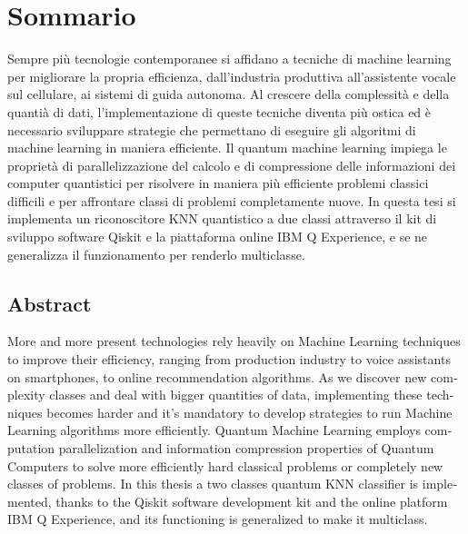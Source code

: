 \begingroup
\let\clearpage\relax
\let\cleardoublepage\relax
\let\cleardoublepage\relax

\chapter*{Sommario}
Sempre più tecnologie contemporanee si affidano a tecniche di machine 
learning per migliorare la propria efficienza, dall'industria produttiva 
all'assistente vocale sul cellulare, ai sistemi di guida autonoma. 
Al crescere della complessità e della quantià di dati, 
l'implementazione di queste tecniche diventa più 
ostica ed è necessario sviluppare strategie che permettano di eseguire 
gli algoritmi di machine learning in maniera efficiente. 
Il quantum machine learning impiega le proprietà di parallelizzazione del 
calcolo e di compressione delle informazioni dei computer quantistici per 
risolvere in maniera più efficiente problemi classici difficili e per 
affrontare classi di problemi completamente nuove. 
In questa tesi si implementa un riconoscitore KNN quantistico a due classi 
attraverso il kit di sviluppo software Qiskit e la piattaforma online 
IBM Q Experience, 
e se ne generalizza il funzionamento per renderlo multiclasse. 



\vfill

\begin{otherlanguage}{english}
\chapter*{Abstract}
More and more present technologies rely heavily on Machine Learning techniques 
to improve their efficiency, ranging from production industry to voice 
assistants on smartphones, to online recommendation algorithms. 
As we discover new complexity classes and deal with bigger quantities of data, 
implementing these techniques becomes harder and it's mandatory to develop 
strategies to run Machine Learning algorithms more efficiently. 
Quantum Machine Learning employs computation parallelization and information 
compression properties of Quantum Computers to solve more efficiently hard 
classical problems or completely new classes of problems. 
In this thesis a two classes quantum KNN classifier is implemented, thanks 
to the Qiskit software development kit and the online platform IBM Q 
Experience, and its functioning is generalized to make it multiclass. 
\end{otherlanguage}

\endgroup

\vfill
